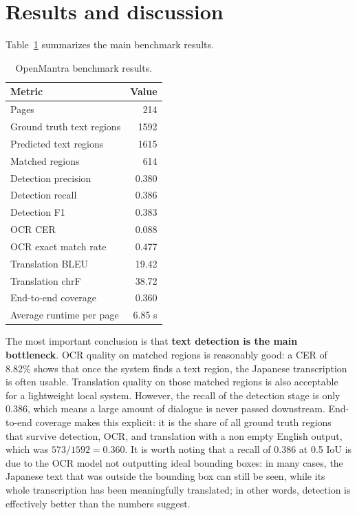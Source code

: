 \documentclass[10pt]{article}
\begin{document}
\section{Results and discussion}
Table~\ref{tab:results} summarizes the main benchmark results.

\begin{table}[H]
\centering
\caption{OpenMantra benchmark results.}
\label{tab:results}
\begin{tabular}{lr}
\toprule
Metric & Value \\
\midrule
Pages & 214 \\
Ground truth text regions & 1592 \\
Predicted text regions & 1615 \\
Matched regions & 614 \\
Detection precision & 0.380 \\
Detection recall & 0.386 \\
Detection F1 & 0.383 \\
OCR CER & 0.088 \\
OCR exact match rate & 0.477 \\
Translation BLEU & 19.42 \\
Translation chrF & 38.72 \\
End-to-end coverage & 0.360 \\
Average runtime per page & 6.85 s \\
\bottomrule
\end{tabular}
\end{table}

The most important conclusion is that \textbf{text detection is the main bottleneck}. OCR quality on matched regions is reasonably good: a CER of 8.82\% shows that once the system finds a text region, the Japanese transcription is often usable. Translation quality on those matched regions is also acceptable for a lightweight local system. However, the recall of the detection stage is only 0.386, which means a large amount of dialogue is never passed downstream. End-to-end coverage makes this explicit: it is the share of all ground truth regions that survive detection, OCR, and translation with a non empty English output, which was $573/1592 = 0.360$. It is worth noting that a recall of 0.386 at 0.5 IoU is due to the OCR model not outputting ideal bounding boxes: in many cases, the Japanese text that was outside the bounding box can still be seen, while its whole transcription has been meaningfully translated; in other words, detection is effectively better than the numbers suggest.
\end{document}
